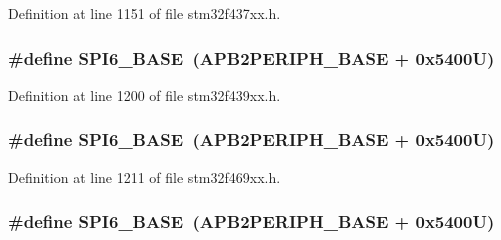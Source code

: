 Definition at line 1151 of file stm32f437xx.\+h.

\subsubsection[{\texorpdfstring{S\+P\+I6\+\_\+\+B\+A\+SE}{SPI6_BASE}}]{\setlength{\rightskip}{0pt plus 5cm}\#define S\+P\+I6\+\_\+\+B\+A\+SE~({\bf A\+P\+B2\+P\+E\+R\+I\+P\+H\+\_\+\+B\+A\+SE} + 0x5400\+U)}\hypertarget{group___peripheral__memory__map_gaf69c602bd348dc0aa1b4e829e40ebb70}{}\label{group___peripheral__memory__map_gaf69c602bd348dc0aa1b4e829e40ebb70}


Definition at line 1200 of file stm32f439xx.\+h.

\subsubsection[{\texorpdfstring{S\+P\+I6\+\_\+\+B\+A\+SE}{SPI6_BASE}}]{\setlength{\rightskip}{0pt plus 5cm}\#define S\+P\+I6\+\_\+\+B\+A\+SE~({\bf A\+P\+B2\+P\+E\+R\+I\+P\+H\+\_\+\+B\+A\+SE} + 0x5400\+U)}\hypertarget{group___peripheral__memory__map_gaf69c602bd348dc0aa1b4e829e40ebb70}{}\label{group___peripheral__memory__map_gaf69c602bd348dc0aa1b4e829e40ebb70}


Definition at line 1211 of file stm32f469xx.\+h.

\subsubsection[{\texorpdfstring{S\+P\+I6\+\_\+\+B\+A\+SE}{SPI6_BASE}}]{\setlength{\rightskip}{0pt plus 5cm}\#define S\+P\+I6\+\_\+\+B\+A\+SE~({\bf A\+P\+B2\+P\+E\+R\+I\+P\+H\+\_\+\+B\+A\+SE} + 0x5400\+U)}\hypertarget{group___peripheral__memory__map_gaf69c602bd348dc0aa1b4e829e40ebb70}{}\label{group___peripheral__memory__map_gaf69c602bd348dc0aa1b4e829e40ebb70}


